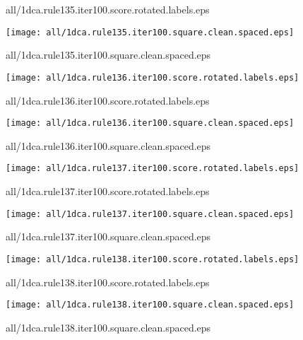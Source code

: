 \documentclass{article}
\begin{document}
{\footnotesize all/1dca.rule135.iter100.score.rotated.labels.eps}
\begin{center}
\begin{minipage}{\textwidth}
\texttt{[image: all/1dca.rule135.iter100.square.clean.spaced.eps]}
\end{minipage}
\end{center}
{\footnotesize all/1dca.rule135.iter100.square.clean.spaced.eps}
\begin{center}
\begin{minipage}{\textwidth}
\texttt{[image: all/1dca.rule136.iter100.score.rotated.labels.eps]}
\end{minipage}
\end{center}
{\footnotesize all/1dca.rule136.iter100.score.rotated.labels.eps}
\begin{center}
\begin{minipage}{\textwidth}
\texttt{[image: all/1dca.rule136.iter100.square.clean.spaced.eps]}
\end{minipage}
\end{center}
{\footnotesize all/1dca.rule136.iter100.square.clean.spaced.eps}
\begin{center}
\begin{minipage}{\textwidth}
\texttt{[image: all/1dca.rule137.iter100.score.rotated.labels.eps]}
\end{minipage}
\end{center}
{\footnotesize all/1dca.rule137.iter100.score.rotated.labels.eps}
\begin{center}
\begin{minipage}{\textwidth}
\texttt{[image: all/1dca.rule137.iter100.square.clean.spaced.eps]}
\end{minipage}
\end{center}
{\footnotesize all/1dca.rule137.iter100.square.clean.spaced.eps}
\begin{center}
\begin{minipage}{\textwidth}
\texttt{[image: all/1dca.rule138.iter100.score.rotated.labels.eps]}
\end{minipage}
\end{center}
{\footnotesize all/1dca.rule138.iter100.score.rotated.labels.eps}
\begin{center}
\begin{minipage}{\textwidth}
\texttt{[image: all/1dca.rule138.iter100.square.clean.spaced.eps]}
\end{minipage}
\end{center}
{\footnotesize all/1dca.rule138.iter100.square.clean.spaced.eps}
\end{document}
